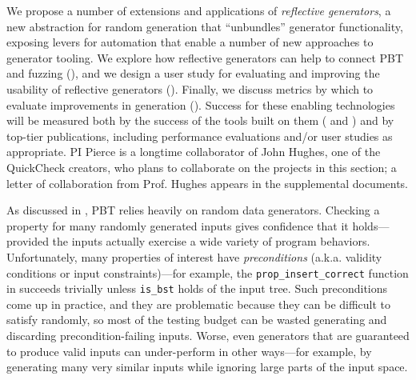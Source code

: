 We propose a number of extensions and applications of {\em reflective
generators}, a new abstraction for random generation that
``unbundles'' generator
functionality, exposing levers for
automation that enable a number of new approaches to generator
tooling. We explore how reflective generators can
help to connect PBT and fuzzing (),
and we design
a user study for evaluating and improving the usability of reflective
generators (). Finally, we discuss metrics
by which to evaluate improvements in generation ().
Success for these enabling technologies will be measured both by the success of
the tools built on them ( and )
and by top-tier publications, including performance evaluations and/or
user studies as appropriate.
PI Pierce is a longtime collaborator of John Hughes, one of the
QuickCheck creators, who plans to collaborate on the projects
in this section; a letter of collaboration from Prof.{} Hughes appears
in the supplemental documents.

As discussed in , PBT relies heavily on {random data
generators}.  Checking a property for many randomly generated inputs
gives confidence that it holds---provided the inputs actually
exercise a wide variety of program behaviors.
Unfortunately,
many properties of interest have {\em preconditions}
({a.k.a.} {validity conditions} or {input constraints})---for example,
the \verb|prop_insert_correct| function in  succeeds trivially unless
\verb|is_bst| holds of the input tree.  Such preconditions come up in
practice, and they are problematic because they can be
difficult to satisfy randomly, so most of the testing budget
can be wasted generating and discarding precondition-failing inputs.
%
%
Worse, even generators that are guaranteed to produce valid
inputs can under-perform in other ways---for example, by
generating many very similar inputs while ignoring large parts of
the input space.

